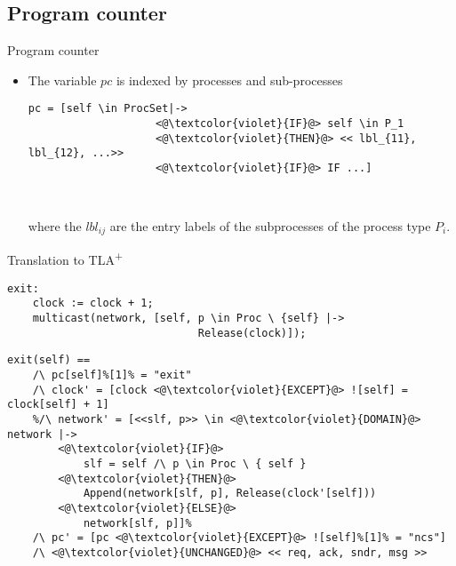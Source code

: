 \documentclass{beamer}
\newcommand{\tlaplus}{TLA\textsuperscript{+}\xspace}
\begin{document}
\subsection{Program counter}

\begin{frame}[fragile]{Program counter}
    \begin{itemize}
     \item The variable $pc$ is indexed by processes and sub-processes

\begin{lstlisting}[language=pluscal, frame = none, numbers = none]
pc = [self \in ProcSet|->
                    <@\textcolor{violet}{IF}@> self \in P_1 
                    <@\textcolor{violet}{THEN}@> << lbl_{11}, lbl_{12}, ...>>
                    <@\textcolor{violet}{IF}@> IF ...]
                    
                    
\end{lstlisting}
	

where the $lbl_{ij}$ are the entry labels of the subprocesses of the process type $P_i$.

\end{itemize}
\end{frame}

\begin{frame}[fragile]{Translation to \tlaplus}
 \begin{lstlisting}[language=pluscal, frame = tlrb, numbers=none]  
 exit:  
    clock := clock + 1;
    multicast(network, [self, p \in Proc \ {self} |->
                              Release(clock)]);
\end{lstlisting}


\begin{lstlisting}[language=pluscal, frame = tlrb, numbers=none]  
exit(self) == 
    /\ pc[self]%[1]% = "exit"
    /\ clock' = [clock <@\textcolor{violet}{EXCEPT}@> ![self] = clock[self] + 1]
    %/\ network' = [<<slf, p>> \in <@\textcolor{violet}{DOMAIN}@> network |->
        <@\textcolor{violet}{IF}@> 
            slf = self /\ p \in Proc \ { self } 
        <@\textcolor{violet}{THEN}@> 
            Append(network[slf, p], Release(clock'[self])) 
        <@\textcolor{violet}{ELSE}@>
            network[slf, p]]%
    /\ pc' = [pc <@\textcolor{violet}{EXCEPT}@> ![self]%[1]% = "ncs"]
    /\ <@\textcolor{violet}{UNCHANGED}@> << req, ack, sndr, msg >>
\end{lstlisting}
\end{frame}
\end{document}

